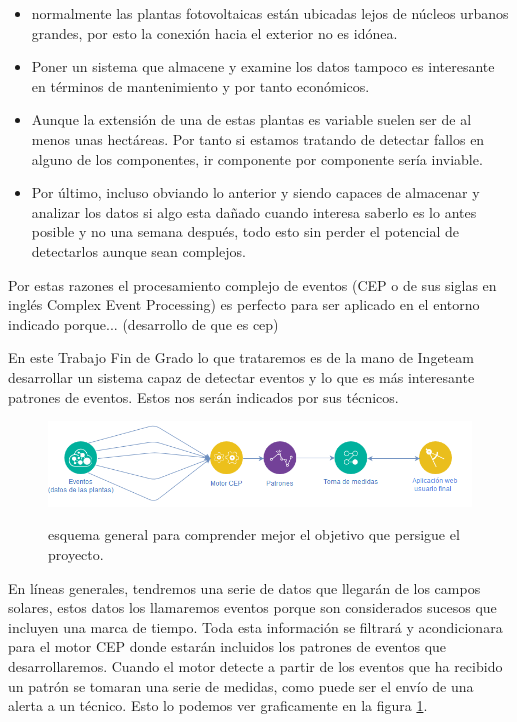 \documentclass[a4paper]{article}
\begin{document}
\begin{itemize}
\item normalmente las plantas fotovoltaicas están ubicadas lejos de núcleos urbanos grandes, por esto la conexión hacia el exterior no es idónea.
\item Poner un sistema que almacene y examine los datos tampoco es interesante en términos de mantenimiento y por tanto económicos.
\item Aunque la extensión de una de estas plantas es variable suelen ser de al menos unas hectáreas. Por tanto si estamos tratando de detectar fallos en alguno de los componentes, ir componente por componente sería inviable.
\item Por último, incluso obviando lo anterior y siendo capaces de almacenar y analizar los datos si algo esta dañado cuando interesa saberlo es lo antes posible y no una semana después, todo esto sin perder el potencial de detectarlos aunque sean complejos.
\end{itemize}

Por estas razones el procesamiento complejo de eventos (CEP o de sus siglas en inglés Complex Event Processing) es perfecto para ser aplicado en el entorno indicado porque... (desarrollo de que es cep)

En este Trabajo Fin de Grado lo que trataremos es de la mano de Ingeteam desarrollar un sistema capaz de detectar eventos y lo que es más interesante patrones de eventos. Estos nos serán indicados por sus técnicos.

\begin{figure}[h]
    \centering
    {\includegraphics[width=\textwidth]{vision_general_fase_3.png}}
    \caption{esquema general para comprender mejor el objetivo que persigue el proyecto.}
    \label{fig:mesh1}
\end{figure}

En líneas generales, tendremos una serie de datos que llegarán de los campos solares, estos datos los llamaremos eventos porque son considerados sucesos que incluyen una marca de tiempo. Toda esta información se filtrará y acondicionara para el motor CEP donde estarán incluidos los patrones de eventos que desarrollaremos. Cuando el motor detecte a partir de los eventos que ha recibido un patrón se tomaran una serie de medidas, como puede ser el envío de una alerta a un técnico. Esto lo podemos ver graficamente en la figura \ref{fig:mesh1}.
\end{document}
